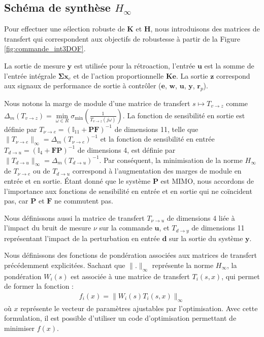\subsection{Schéma de synthèse $H_{\infty}$}
 \label{sec:h_inf3DOF}

Pour effectuer une sélection robuste de $\boldsymbol{K}$ et $\boldsymbol{H}$, nous introduisons des matrices de transfert qui correspondent aux objectifs de robustesse à partir de la Figure \ref{fig:commande_int3DOF}.

La sortie de mesure $\boldsymbol{y}$ est utilisée pour la rétroaction, l'entrée $\boldsymbol{u}$ est la somme de l'entrée intégrale $\boldsymbol{\Sigma} \boldsymbol{x}_{c}$ et de l'action proportionnelle $\boldsymbol{K} \boldsymbol{e}$. La sortie $\boldsymbol{z}$ correspond aux signaux de performance de sortie à contrôler ($\boldsymbol{e}$, $\boldsymbol{w}$, $\boldsymbol{u}$, $\boldsymbol{y}$, $\boldsymbol{r}_{p}$).

Nous notons la marge de module d'une matrice de transfert $s \mapsto T_{v \rightarrow z}$ comme $\Delta_m(T_{v \rightarrow z}) = \min\limits_{\omega\in R} \sigma_{\min}(\frac{1}{T_{v \rightarrow z}(j\omega)})$. La fonction de sensibilité en sortie est définie par $T_{\nu \rightarrow e}=(\mathbb{I}_{11}+\boldsymbol{P}\boldsymbol{F})^{-1}$ de dimensions 11, telle que $\lVert T_{\nu \rightarrow e} \rVert _{\infty}=\Delta_m(T_{\nu \rightarrow e})^{-1} $ et la fonction de sensibilité en entrée $T_{d \rightarrow u}=(\mathbb{I}_{4}+\boldsymbol{F}\boldsymbol{P})^{-1}$ de dimensions 4, est définie par $\lVert T_{d \rightarrow u} \rVert _{\infty}=\Delta_m(T_{d \rightarrow u})^{-1}$.
Par conséquent, la minimisation de la norme $H_{\infty}$ de $T_{\nu \rightarrow e}$ ou de $T_{d \rightarrow u}$ correspond à l'augmentation des marges de module en entrée et en sortie. Étant donné que le système $\boldsymbol{P}$ est MIMO, nous accordons de l'importance aux fonctions de sensibilité en entrée et en sortie qui ne coïncident pas, car $\boldsymbol{P}$ et $\boldsymbol{F}$ ne commutent pas.

Nous définissons aussi la matrice de transfert $T_{\nu \rightarrow u}$ de dimensions 4 liée à l'impact du bruit de mesure $\nu$ sur la commande $\boldsymbol{u}$, et $T_{d \rightarrow y}$ de dimensions 11 représentant l'impact de la perturbation en entrée $\boldsymbol{d}$ sur la sortie du système $\boldsymbol{y}$. 

Nous définissons des fonctions de pondération associées aux matrices de transfert précédemment explicitées. Sachant que $ \| . \|_{\infty}$ représente la norme $H_{\infty}$, la pondération $W_{i}(s)$ est associée à une matrice de transfert $ T_{i}(s, x)$, qui permet de former la fonction :
\begin{align}
    \label{eq:formecontrainte}
    f_{i}(x) = \| W_{i}(s) T_{i}(s, x) \|_{\infty}
\end{align}
où $x$ représente le vecteur de paramètres ajustables par l'optimisation. Avec cette formulation, il est possible d'utiliser un code d'optimisation permettant de minimiser $f(x)$.

